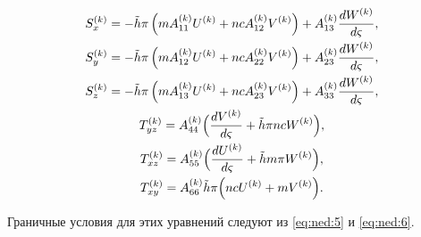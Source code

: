 \begin{equation}

\label{eq:ned:9}

\begin{array}{c}

\displaystyle S_x^{(k)}=-\tilde h\pi\left({mA_{11}^{(k)} U^{(k)}+ncA_{12}^{(k)} V^{(k)}}\right)+ A_{13}^{(k)}\frac{{dW^{(k)}}}{{d\varsigma}},\\ [8pt]



\displaystyle S_y^{(k)}=-\tilde h\pi\left({mA_{12}^{(k)} U^{(k)}+ncA_{22}^{(k)} V^{(k)}}\right)+ A_{23}^{(k)}\frac{{dW^{(k)}}}{{d\varsigma}},\\ [8pt]



\displaystyle S_z^{(k)}=-\tilde h\pi\left({mA_{13}^{(k)} U^{(k)}+ncA_{23}^{(k)} V^{(k)}}\right)+ A_{33}^{(k)}\frac{{dW^{(k)}}}{{d\varsigma}},\\ [8pt]



\displaystyle T_{yz}^{(k)}=A_{44}^{(k)}\Bigl({\frac{{dV^{(k)}}}{{d\varsigma}}+\tilde h\pi nc W^{(k)}}\Bigr),\\ [8pt]



\displaystyle T_{xz}^{(k)}=A_{55}^{(k)}\Bigl({\frac{{dU^{(k)}}}{{d\varsigma}}+\tilde hm\pi W^{(k)}}\Bigr),\\ [8pt]



\displaystyle T_{xy}^{(k)}=A_{66}^{(k)}\tilde h\pi\Bigl({ncU^{(k)}+ mV^{(k)}}\Bigr).

\end{array}

\end{equation}

Граничные условия для этих уравнений следуют из \eqref{eq:ned:5} и \eqref{eq:ned:6}.






\smallskip




